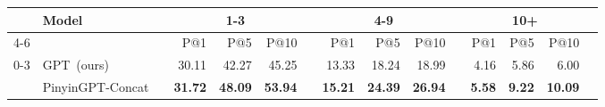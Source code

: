 \begin{table*}[t]
\centering
\small
\begin{tabular}{llrrrrrrrrrrrrr}\toprule
 &\multirow{3}{*}{Model}& &\multicolumn{3}{c}{1-3} & &\multicolumn{3}{c}{4-9} & &\multicolumn{3}{c}{10+} \\\cmidrule{4-6}\cmidrule{8-10}\cmidrule{12-14}
& & &P@1 &P@5 &P@10 & &P@1 &P@5 &P@10 & &P@1 &P@5 &P@10 \\\midrule
\multirow{2}{*}{0-3} &GPT~(ours) & &30.11 &42.27 &45.25 & &13.33 &18.24 &18.99 & &4.16 &5.86 &6.00 \\
&PinyinGPT-Concat & &\textbf{31.72} &\textbf{48.09} &\textbf{53.94} &\textbf{} &\textbf{15.21} &\textbf{24.39} &\textbf{26.94} &\textbf{} &\textbf{5.58} &\textbf{9.22} &\textbf{10.09} \\\midrule

\end{tabular}
\end{table*}

